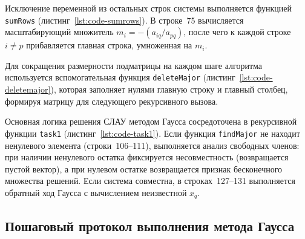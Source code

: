 \begin{listing}[H]
    \caption{Функция findMajor для поиска максимального по модулю элемента}
    \label{lst:code-findmajor}
\end{listing}

Исключение переменной из остальных строк системы выполняется функцией \texttt{sumRows} (листинг~\ref{lst:code-sumrows}). В строке~75 вычисляется масштабирующий множитель $m_i = -(a_{iq} / a_{pq})$, после чего к каждой строке $i \neq p$ прибавляется главная строка, умноженная на $m_i$.

\begin{listing}[H]
    \caption{Функция sumRows для исключения главного столбца из строк}
    \label{lst:code-sumrows}
\end{listing}

Для сокращения размерности подматрицы на каждом шаге алгоритма используется вспомогательная функция \texttt{deleteMajor} (листинг~\ref{lst:code-deletemajor}), которая заполняет нулями главную строку и главный столбец, формируя матрицу для следующего рекурсивного вызова.

\begin{listing}[H]
    \caption{Функция deleteMajor для обнуления главной строки и столбца}
    \label{lst:code-deletemajor}
\end{listing}

Основная логика решения СЛАУ методом Гаусса сосредоточена в рекурсивной функции \texttt{task1} (листинг~\ref{lst:code-task1}). Если функция \texttt{findMajor} не находит ненулевого элемента (строки~106--111), выполняется анализ свободных членов: при наличии ненулевого остатка фиксируется несовместность (возвращается пустой вектор), а при нулевом остатке возвращается признак бесконечного множества решений. Если система совместна, в строках~127--131 выполняется обратный ход Гаусса с вычислением неизвестной $x_q$.

\begin{listing}[H]
    \caption{Рекурсивная функция task1 метода Гаусса с обратным ходом}
    \label{lst:code-task1}
\end{listing}

\subsection{Пошаговый протокол выполнения метода Гаусса}

